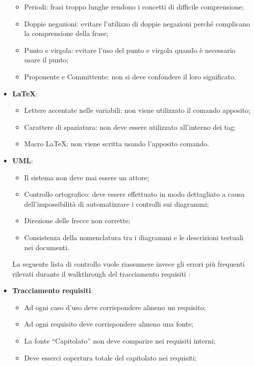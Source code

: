 \begin{itemize}
\begin{itemize}
\item Periodi: frasi troppo lunghe rendono i concetti di difficile comprensione;
\item Doppie negazioni: evitare l’utilizzo di doppie negazioni perché complicano la
comprensione della frase;
\item Punto e virgola: evitare l’uso del punto e virgola quando è necessario usare
il punto;
\item Proponente e Committente: non si deve confondere il loro significato.
\end{itemize}
\item \textbf{\LaTeX}:
\begin{itemize}
\item Lettere accentate nelle variabili: non viene utilizzato il comando apposito;
\item Carattere di spaziatura: non deve essere utilizzato all’interno dei tag;
\item Macro \LaTeX: non viene scritta usando l'apposito comando.
\end{itemize}
\item \textbf{UML}:
\begin{itemize}
\item Il sistema non deve mai essere un attore;
\item Controllo ortografico: deve essere effettuato in modo dettagliato a causa dell'impossibilità di automatizzare i controlli sui diagrammi;
\item Direzione delle frecce non corrette;
\item Consistenza della nomenclatura tra i diagrammi e le descrizioni testuali nei documenti.
\end{itemize}
La seguente lista di controllo vuole riassumere invece gli errori più frequenti rilevati
durante il walkthrough del tracciamento requisiti :

\item \textbf{Tracciamento requisiti}:
\begin{itemize}

\item Ad ogni caso d’uso deve corrispondere almeno un requisito;
\item Ad ogni requisito deve corrispondere almeno una fonte;
\item La fonte “Capitolato” non deve comparire nei requisiti interni;
\item Deve esserci copertura totale del capitolato nei requisiti;

\end{itemize}
\end{itemize}
